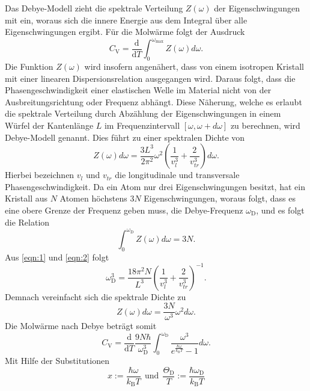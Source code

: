 Das Debye-Modell zieht die spektrale Verteilung $Z(\omega)$ der Eigenschwingungen mit ein, woraus sich die innere Energie aus dem Integral über alle Eigenschwingungen ergibt.
Für die Molwärme folgt der Ausdruck
\begin{equation}
  C_{\text{V}} = \frac{\mathrm{d}}{\mathrm{d}T}\int_{0}^{\omega_{\text{max}}}Z(\omega)d\omega.
\end{equation}
Die Funktion $Z(\omega)$ wird insofern angenähert, dass von einem isotropen Kristall mit einer linearen Dispersionsrelation ausgegangen wird.
Daraus folgt, dass die Phasengeschwindigkeit einer elastischen Welle im Material nicht von der Ausbreitungsrichtung oder Frequenz abhängt.
Diese Näherung, welche es erlaubt die spektrale Verteilung durch Abzählung der Eigenschwingungen in einem Würfel der Kantenlänge $L$ im Frequenzintervall $[\omega,\omega+d\omega]$ zu berechnen, wird Debye-Modell genannt.
Dies führt zu einer spektralen Dichte von
\begin{equation}
  Z(\omega)d\omega = \frac{3L^3}{2\pi^2}\omega^2\left(\frac{1}{v_l^3}+\frac{2}{v_{tr}^3}\right)d\omega. \label{eqn:1}
\end{equation}
Hierbei bezeichnen $v_l$ und $v_{tr}$ die longitudinale und transversale Phasengeschwindigkeit.
Da ein Atom nur drei Eigenschwingungen besitzt, hat ein Kristall aus $N$ Atomen höchstens $3N$ Eigenschwingungen, woraus folgt, dass es eine obere Grenze der Frequenz geben muss, die Debye-Frequenz $\omega_{\text{D}}$, und es folgt die Relation
\begin{equation}
  \int_{0}^{\omega_{\text{D}}}Z(\omega)d\omega = 3N. \label{eqn:2}
\end{equation}
Aus \eqref{eqn:1} und \eqref{eqn:2} folgt
\begin{equation}
  \omega_{\text{D}}^3 = \frac{18\pi^2N}{L^3}\left(\frac{1}{v_l^3}+\frac{2}{v_{tr}^3} \right)^{-1}. \label{eqn:3}
\end{equation}
Demnach vereinfacht sich die spektrale Dichte zu
\begin{equation}
  Z(\omega)d\omega = \frac{3N}{\omega^3}\omega^2d\omega.
\end{equation}
Die Molwärme nach Debye beträgt somit
\begin{equation}
  C_{\text{V}} = \frac{\mathrm{d}}{\mathrm{d}T}\frac{9N\hbar}{\omega_{\text{D}}^3} \int_{0}^{\omega_{\text{D}}}\frac{\omega^3}{e^{\frac{\hbar\omega}{k_{\text{B}}T}}-1}d\omega.
\end{equation}
Mit Hilfe der Substitutionen
\begin{equation}
  x := \frac{\hbar\omega}{k_{\text{B}}T} \:\: \text{und} \:\: \frac{\Theta_{\text{D}}}{T} := \frac{\hbar\omega_{\text{D}}}{k_{\text{B}}T} \label{eqn:4}
\end{equation}
